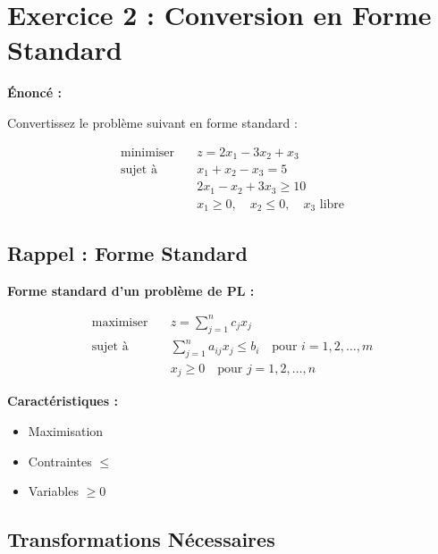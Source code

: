 \documentclass[12pt,a4paper]{article}
\begin{document}
\newpage
\section{Exercice 2 : Conversion en Forme Standard}

\begin{exercice}
\textbf{Énoncé :}

Convertissez le problème suivant en forme standard :

\begin{align*}
\text{minimiser} \quad & z = 2x_1 - 3x_2 + x_3\\
\text{sujet à} \quad & x_1 + x_2 - x_3 = 5\\
& 2x_1 - x_2 + 3x_3 \geq 10\\
& x_1 \geq 0, \quad x_2 \leq 0, \quad x_3 \text{ libre}
\end{align*}
\end{exercice}

\subsection{Rappel : Forme Standard}

\begin{methode}
\textbf{Forme standard d'un problème de PL :}

\begin{align*}
\text{maximiser} \quad & z = \sum_{j=1}^{n} c_jx_j\\
\text{sujet à} \quad & \sum_{j=1}^{n} a_{ij}x_j \leq b_i \quad \text{pour } i = 1, 2, \ldots, m\\
& x_j \geq 0 \quad \text{pour } j = 1, 2, \ldots, n
\end{align*}

\textbf{Caractéristiques :}
\begin{itemize}
    \item \textcolor{importantrouge}{Maximisation}
    \item \textcolor{defvert}{Contraintes $\leq$}
    \item \textcolor{titrebleu}{Variables $\geq 0$}
\end{itemize}
\end{methode}

\newpage
\subsection{Transformations Nécessaires}
\end{document}
